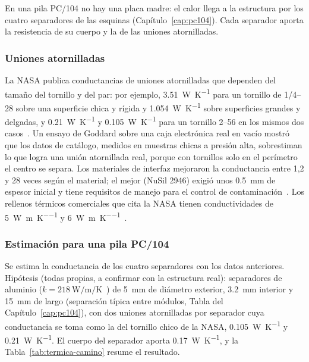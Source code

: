 En una pila PC/104 no hay una placa madre: el calor llega a la estructura por los cuatro separadores de las esquinas (Capítulo~\ref{cap:pc104}). Cada separador aporta la resistencia de su cuerpo y la de las uniones atornilladas.

\subsubsection{Uniones atornilladas}

La NASA publica conductancias de uniones atornilladas que dependen del tamaño del tornillo y del par: por ejemplo, \SI{3,51}{\watt\per\kelvin} para un tornillo de 1/4--28 sobre una superficie chica y rígida y \SI{1,054}{\watt\per\kelvin} sobre superficies grandes y delgadas, y \SI{0,21}{\watt\per\kelvin} y \SI{0,105}{\watt\per\kelvin} para un tornillo 2--56 en los mismos dos casos~\cite{nasasoa}. Un ensayo de Goddard sobre una caja electrónica real en vacío mostró que los datos de catálogo, medidos en muestras chicas a presión alta, sobrestiman lo que logra una unión atornillada real, porque con tornillos solo en el perímetro el centro se separa. Los materiales de interfaz mejoraron la conductancia entre 1,2 y 28 veces según el material; el mejor (NuSil 2946) exigió unos \SI{0,5}{\milli\metre} de espesor inicial y tiene requisitos de manejo para el control de contaminación~\cite{steinfeld23}. Los rellenos térmicos comerciales que cita la NASA tienen conductividades de \SI{5}{\watt\per\metre\per\kelvin} y \SI{6}{\watt\per\metre\per\kelvin}~\cite{nasasoa}.

\subsubsection{Estimación para una pila PC/104}

Se estima la conductancia de los cuatro separadores con los datos anteriores. Hipótesis (todas propias, a confirmar con la estructura real): separadores de aluminio ($k = \SI{218}{\watt\per\metre\per\kelvin}$~\cite{guerra18}) de \SI{5}{\milli\metre} de diámetro exterior, \SI{3,2}{\milli\metre} interior y \SI{15}{\milli\metre} de largo (separación típica entre módulos, Tabla del Capítulo~\ref{cap:pc104}), con dos uniones atornilladas por separador cuya conductancia se toma como la del tornillo chico de la NASA, \SI{0,105}{\watt\per\kelvin} y \SI{0,21}{\watt\per\kelvin}. El cuerpo del separador aporta \SI{0,17}{\watt\per\kelvin}, y la Tabla~\ref{tab:termica-camino} resume el resultado.

